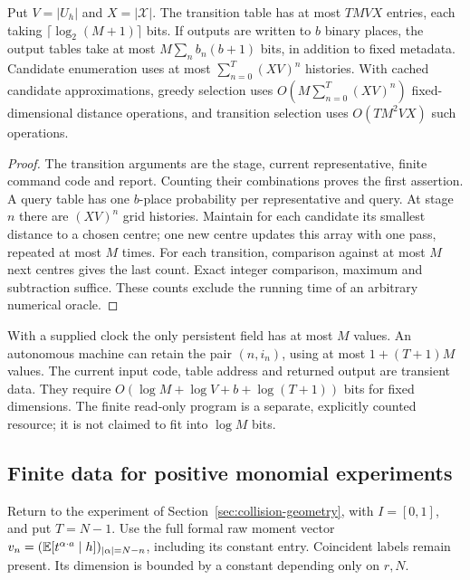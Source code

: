 \begin{proposition}\label{prop:compiler-size}
Put $V=|U_h|$ and $X=|\mathcal X|$. The transition table has at most
$TMVX$ entries, each taking $\lceil\log_2(M+1)\rceil$ bits. If outputs
are written to $b$ binary places, the output tables take at most
$M\sum_nb_n(b+1)$ bits, in addition to fixed metadata. Candidate
enumeration uses at most $\sum_{n=0}^T(XV)^n$ histories. With cached
candidate approximations, greedy selection uses
$O(M\sum_{n=0}^T(XV)^n)$ fixed-dimensional distance operations, and
transition selection uses $O(TM^2VX)$ such operations.
\end{proposition}
\begin{proof}
The transition arguments are the stage, current representative, finite
command code and report. Counting their combinations proves the first
assertion. A query table has one $b$-place probability per representative
and query. At stage $n$ there are $(XV)^n$ grid histories. Maintain for
each candidate its smallest distance to a chosen centre; one new centre
updates this array with one pass, repeated at most $M$ times. For each
transition, comparison against at most $M$ next centres gives the last
count. Exact integer comparison, maximum and subtraction suffice.
These counts exclude the running time of an arbitrary numerical oracle.
\end{proof}

With a supplied clock the only persistent field has at most $M$ values.
An autonomous machine can retain the pair $(n,i_n)$, using at most
$1+(T+1)M$ values. The current input code, table address and returned
output are transient data. They require $O(\log M+\log V+b+\log(T+1))$
bits for fixed dimensions. The finite read-only program is a separate,
explicitly counted resource; it is not claimed to fit into $\log M$ bits.

\subsection{Finite data for positive monomial experiments}
Return to the experiment of Section~\ref{sec:collision-geometry}, with
$I=[0,1]$, and put $T=N-1$. Use the full formal raw moment vector
$v_n=(\mathbb E[t^{\alpha\cdot a}\mid h])_{|\alpha|=N-n}$, including its
constant entry. Coincident labels remain present. Its dimension is
bounded by a constant depending only on $r,N$.


